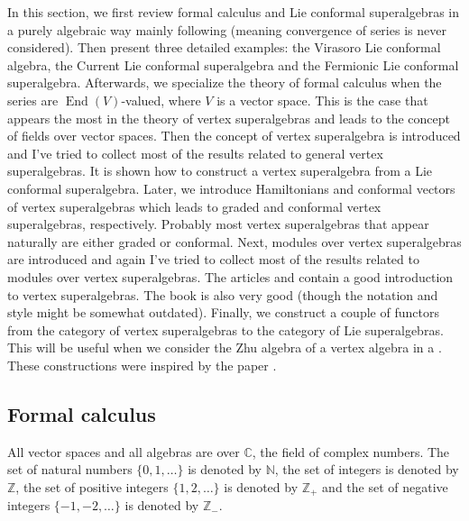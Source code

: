 \documentclass[a4paper, 12pt, reqno]{amsart}
\theoremstyle{remark}
\numberwithin{equation}{subsection}
\DeclareMathOperator{\End}{End}
\begin{document}
In this section, we first review formal calculus and Lie conformal superalgebras in a purely algebraic way mainly following \cite{nozaradan_introduction_2008} (meaning convergence of series is never considered).
Then present three detailed examples: the Virasoro Lie conformal algebra, the Current Lie conformal superalgebra and the Fermionic Lie conformal superalgebra.
Afterwards, we specialize the theory of formal calculus when the series are $\End(V)$-valued, where $V$ is a vector space.
This is the case that appears the most in the theory of vertex superalgebras and leads to the concept of fields over vector spaces.
Then the concept of vertex superalgebra is introduced and I've tried to collect most of the results related to general vertex superalgebras.
It is shown how to construct a vertex superalgebra from a Lie conformal superalgebra.
Later, we introduce Hamiltonians and conformal vectors of vertex superalgebras which leads to graded and conformal vertex superalgebras, respectively.
Probably most vertex superalgebras that appear naturally are either graded or conformal.
Next, modules over vertex superalgebras are introduced and again I've tried to collect most of the results related to modules over vertex superalgebras.
The articles \cite{de_sole_finite_2006} and \cite{callegaro_introduction_2017} contain a good introduction to vertex superalgebras.
The book \cite{kac_vertex_1998} is also very good (though the notation and style might be somewhat outdated).
Finally, we construct a couple of functors from the category of vertex superalgebras to the category of Lie superalgebras.
This will be useful when we consider the Zhu algebra of a vertex algebra in a .
These constructions were inspired by the paper \cite{dong_twisted_1998}.

\subsection{Formal calculus}
\label{sec:formal-calculus}

All vector spaces and all algebras are over $\mathbb{C}$, the field of complex numbers.
The set of natural numbers $\{0, 1, \dots\}$ is denoted by $\mathbb{N}$, the set of integers is denoted by $\mathbb{Z}$, the set of positive integers $\{1, 2, \dots\}$ is denoted by $\mathbb{Z}_+$ and the set of negative integers $\{-1, -2, \dots\}$ is denoted by $\mathbb{Z}_-$.
\end{document}
